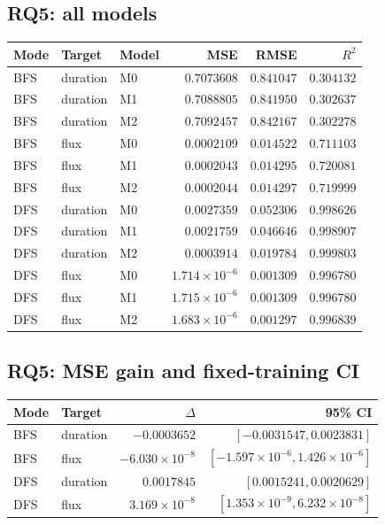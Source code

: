 \documentclass[11pt,a4paper]{article}
\begin{document}
\subsection{RQ5: all models}
{\small\setlength{\tabcolsep}{5pt}
\begin{longtable}{lllrrr}
\toprule
Mode & Target & Model & MSE & RMSE & $R^2$ \\
\midrule\endhead
BFS & duration & M0 & $0.7073608$ & $0.841047$ & $0.304132$ \\
BFS & duration & M1 & $0.7088805$ & $0.841950$ & $0.302637$ \\
BFS & duration & M2 & $0.7092457$ & $0.842167$ & $0.302278$ \\
BFS & flux & M0 & $0.0002109$ & $0.014522$ & $0.711103$ \\
BFS & flux & M1 & $0.0002043$ & $0.014295$ & $0.720081$ \\
BFS & flux & M2 & $0.0002044$ & $0.014297$ & $0.719999$ \\
DFS & duration & M0 & $0.0027359$ & $0.052306$ & $0.998626$ \\
DFS & duration & M1 & $0.0021759$ & $0.046646$ & $0.998907$ \\
DFS & duration & M2 & $0.0003914$ & $0.019784$ & $0.999803$ \\
DFS & flux & M0 & $1.714\times10^{-6}$ & $0.001309$ & $0.996780$ \\
DFS & flux & M1 & $1.715\times10^{-6}$ & $0.001309$ & $0.996780$ \\
DFS & flux & M2 & $1.683\times10^{-6}$ & $0.001297$ & $0.996839$ \\
\bottomrule
\end{longtable}}

\subsection{RQ5: MSE gain and fixed-training CI}
{\small\setlength{\tabcolsep}{5pt}
\begin{longtable}{llrr}
\toprule
Mode & Target & $\Delta$ & 95\% CI \\
\midrule\endhead
BFS & duration & $-0.0003652$ & $[-0.0031547, 0.0023831]$ \\
BFS & flux & $-6.030\times10^{-8}$ & $[-1.597\times10^{-6}, 1.426\times10^{-6}]$ \\
DFS & duration & $0.0017845$ & $[0.0015241, 0.0020629]$ \\
DFS & flux & $3.169\times10^{-8}$ & $[1.353\times10^{-9}, 6.232\times10^{-8}]$ \\
\bottomrule
\end{longtable}}
\end{document}
